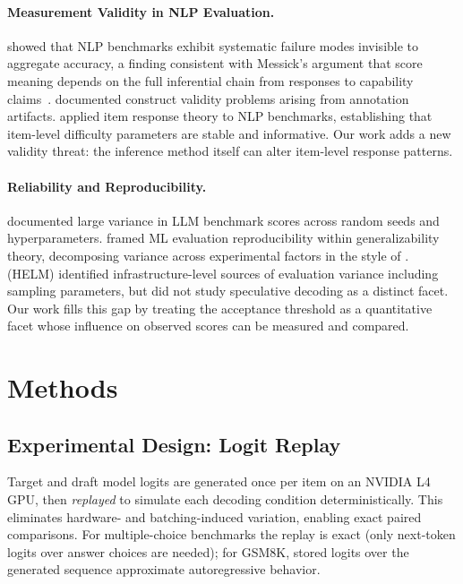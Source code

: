 \documentclass{article}
\begin{document}
\paragraph{Measurement Validity in NLP Evaluation.}
\citet{ribeiro2020beyond} showed that NLP benchmarks exhibit systematic failure modes invisible to aggregate accuracy, a finding consistent with Messick's argument that score meaning depends on the full inferential chain from responses to capability claims~\citep{messick1995validity}. \citet{gururangan2018annotation} documented construct validity problems arising from annotation artifacts. \citet{ethayarajh2022authenticity} applied item response theory to NLP benchmarks, establishing that item-level difficulty parameters are stable and informative. Our work adds a new validity threat: the inference method itself can alter item-level response patterns.

\paragraph{Reliability and Reproducibility.}
\citet{dodge2020fine} documented large variance in LLM benchmark scores across random seeds and hyperparameters. \citet{bouthillier2021accounting} framed ML evaluation reproducibility within generalizability theory, decomposing variance across experimental factors in the style of \citet{cronbach1972dependability}. \citet{liang2022holistic} (HELM) identified infrastructure-level sources of evaluation variance including sampling parameters, but did not study speculative decoding as a distinct facet. Our work fills this gap by treating the acceptance threshold as a quantitative facet whose influence on observed scores can be measured and compared.

\section{Methods}

\subsection{Experimental Design: Logit Replay}

Target and draft model logits are generated once per item on an NVIDIA L4 GPU, then \emph{replayed} to simulate each decoding condition deterministically. This eliminates hardware- and batching-induced variation, enabling exact paired comparisons. For multiple-choice benchmarks the replay is exact (only next-token logits over answer choices are needed); for GSM8K, stored logits over the generated sequence approximate autoregressive behavior.
\end{document}
